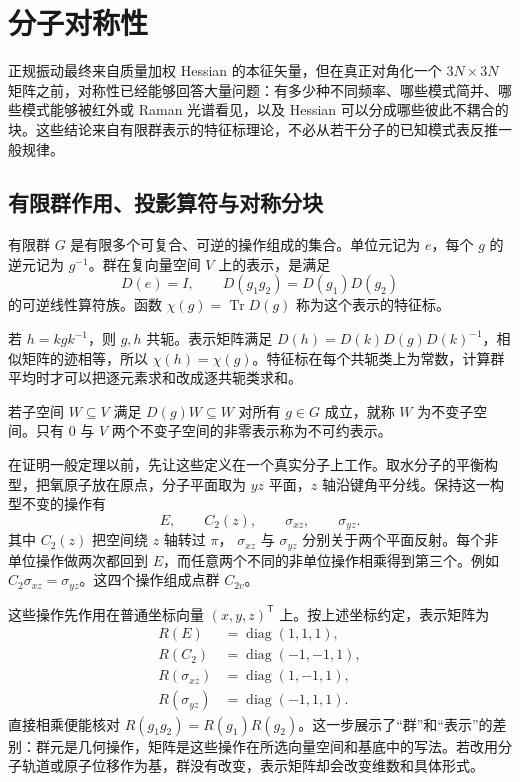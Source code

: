 \section{分子对称性}
\label{ch:molecular-symmetry}

正规振动最终来自质量加权 Hessian 的本征矢量，但在真正对角化一个 \(3N\times3N\) 矩阵之前，对称性已经能够回答大量问题：有多少种不同频率、哪些模式简并、哪些模式能够被红外或 Raman 光谱看见，以及 Hessian 可以分成哪些彼此不耦合的块。这些结论来自有限群表示的特征标理论，不必从若干分子的已知模式表反推一般规律。
\subsection{有限群作用、投影算符与对称分块}

\begin{definition}
有限群 \(G\) 是有限多个可复合、可逆的操作组成的集合。单位元记为 \(e\)，每个 \(g\) 的逆元记为 \(g^{-1}\)。群在复向量空间 \(V\) 上的表示，是满足
\[
D(e)=I,\qquad D(g_1g_2)=D(g_1)D(g_2)
\]
的可逆线性算符族。函数
\(\chi(g)=\operatorname{Tr}D(g)\) 称为这个表示的特征标。
\end{definition}

若 \(h=k g k^{-1}\)，则 \(g,h\) 共轭。表示矩阵满足
\(D(h)=D(k)D(g)D(k)^{-1}\)，相似矩阵的迹相等，所以
\(\chi(h)=\chi(g)\)。特征标在每个共轭类上为常数，计算群平均时才可以把逐元素求和改成逐共轭类求和。

\begin{definition}[不可约表示]
若子空间 \(W\subseteq V\) 满足 \(D(g)W\subseteq W\) 对所有
\(g\in G\) 成立，就称 \(W\) 为不变子空间。只有 \(0\) 与 \(V\) 两个不变子空间的非零表示称为不可约表示。
\end{definition}

在证明一般定理以前，先让这些定义在一个真实分子上工作。取水分子的平衡构型，把氧原子放在原点，分子平面取为 \(yz\) 平面，\(z\) 轴沿键角平分线。保持这一构型不变的操作有
\[
E,\qquad C_2(z),\qquad \sigma_{xz},\qquad \sigma_{yz}.
\]
其中 \(C_2(z)\) 把空间绕 \(z\) 轴转过 \(\pi\)，
\(\sigma_{xz}\) 与 \(\sigma_{yz}\) 分别关于两个平面反射。每个非单位操作做两次都回到 \(E\)，而任意两个不同的非单位操作相乘得到第三个。例如
\(C_2\sigma_{xz}=\sigma_{yz}\)。这四个操作组成点群 \(C_{2v}\)。

这些操作先作用在普通坐标向量
\((x,y,z)^{\mathsf T}\) 上。按上述坐标约定，表示矩阵为
\[
\begin{aligned}
R(E)&=\operatorname{diag}(1,1,1),\\
R(C_2)&=\operatorname{diag}(-1,-1,1),\\
R(\sigma_{xz})&=\operatorname{diag}(1,-1,1),\\
R(\sigma_{yz})&=\operatorname{diag}(-1,1,1).
\end{aligned}
\]
直接相乘便能核对
\(R(g_1g_2)=R(g_1)R(g_2)\)。这一步展示了“群”和“表示”的差别：群元是几何操作，矩阵是这些操作在所选向量空间和基底中的写法。若改用分子轨道或原子位移作为基，群没有改变，表示矩阵却会改变维数和具体形式。

